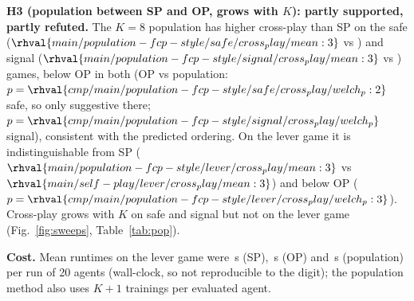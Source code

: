 \textbf{H3 (population between SP and OP, grows with $K$): partly supported, partly refuted.} The $K=8$ population has higher cross-play than SP on the safe ($\rhval{main/population-fcp-style/safe/cross_play/mean:3}$ vs ) and signal ($\rhval{main/population-fcp-style/signal/cross_play/mean:3}$ vs ) games, below OP in both (OP vs population: $p=\rhval{cmp/main/population-fcp-style/safe/cross_play/welch_p:2}$ safe, so only suggestive there; $p=\rhval{cmp/main/population-fcp-style/signal/cross_play/welch_p}$ signal), consistent with the predicted ordering. On the lever game it is indistinguishable from SP ($\rhval{main/population-fcp-style/lever/cross_play/mean:3}$ vs $\rhval{main/self-play/lever/cross_play/mean:3}$) and below OP ($p=\rhval{cmp/main/population-fcp-style/lever/cross_play/welch_p:3}$). Cross-play grows with $K$ on safe and signal but not on the lever game (Fig.~\ref{fig:sweeps}, Table~\ref{tab:pop}).

\textbf{Cost.} Mean runtimes on the lever game were \,s (SP), \,s (OP) and \,s (population) per run of 20 agents (wall-clock, so not reproducible to the digit); the population method also uses $K{+}1$ trainings per evaluated agent.

